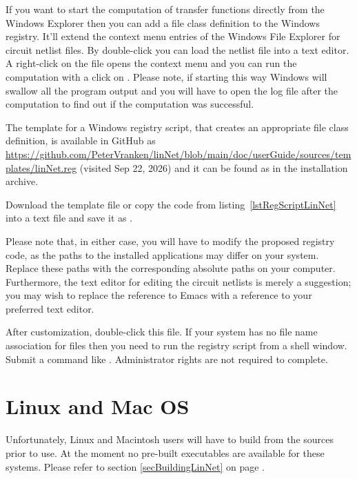 If you want to start the computation of transfer functions directly from
the Windows Explorer then you can add a file class definition to the
Windows registry. It'll extend the context menu entries of the Windows
File Explorer for circuit netlist files. By double-click you can load the
netlist file into a text editor. A right-click on the file opens the
context menu and you can run the computation with a click on . Please note, if starting \linnet{} this way Windows will swallow
all the program output and you will have to open the log file after the
computation to find out if the computation was successful.

The template for a Windows registry script, that creates an appropriate
file class definition, is available in GitHub as
\href{https://github.com/PeterVranken/linNet/blob/main/doc/userGuide/sources/templates/linNet.reg}
{https://github.com/PeterVranken/linNet/blob/main/doc/userGuide/sources/templates/\-lin\-Net.reg}
(visited Sep 22, 2026) and it can be found as  in the
installation archive.



Download the template file or copy the code from
listing~\ref{lstRegScriptLinNet} into a text file and save it as
.

Please note that, in either case, you will have to modify the proposed
registry code, as the paths to the installed applications may differ on
your system. Replace these paths with the corresponding absolute paths on
your computer. Furthermore, the text editor for editing the circuit
netlists is merely a suggestion; you may wish to replace the reference to
Emacs with a reference to your preferred text editor.

After customization, double-click this file. If your system has no file
name association for  files then you need to run the registry
script from a shell window. Submit a command like . Administrator rights are not required to complete.

\section{Linux and Mac OS}

Unfortunately, Linux and Macintosh users will have to build \linnet{} from
the sources prior to use. At the moment no pre-built executables are
available for these systems. Please refer to section
\ref{secBuildingLinNet} on page \pageref{secBuildingLinNet}.
